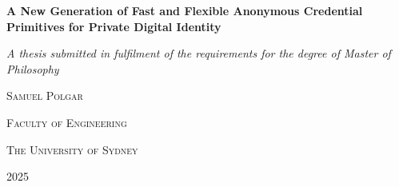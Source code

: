 \begin{titlepage}
    \centering
    {\Huge \textbf{A New Generation of Fast and Flexible Anonymous Credential Primitives for Private Digital Identity} \par} \vspace{1.5cm}
    {\large \emph{A thesis submitted in fulfilment of the requirements for the degree of Master of Philosophy}\par} \vspace{2cm}
    {\LARGE \textsc{Samuel Polgar} \par} \vspace{9cm}
    {\Large \textsc{Faculty of Engineering}\par}
    {\Large \textsc{The University of Sydney} \par} \vspace{1cm}
    {\large 2025}
\end{titlepage}

% 